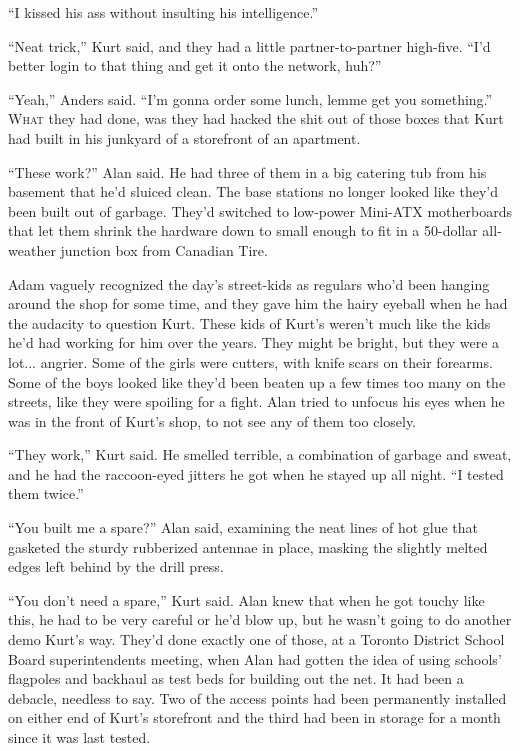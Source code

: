\documentclass{article}
\begin{document}
``I kissed his ass without insulting his intelligence.''

``Neat trick,'' Kurt said, and they had a little partner-to-partner
high-five.  ``I'd better login to that thing and get it onto the
network, huh?''

``Yeah,'' Anders said.  ``I'm gonna order some lunch, lemme get you
something.''
\\
\lettrine[lines=3, lhang=.5, nindent=0pt, findent=2pt]{W}{hat} they had done, was they had hacked the shit out of those boxes
that Kurt had built in his junkyard of a storefront of an apartment.

``These work?'' Alan said.  He had three of them in a big catering tub
from his basement that he'd sluiced clean.  The base stations no
longer looked like they'd been built out of garbage.  They'd switched
to low-power Mini-ATX motherboards that let them shrink the hardware
down to small enough to fit in a 50-dollar all-weather junction box
from Canadian Tire.

Adam vaguely recognized the day's street-kids as regulars who'd been
hanging around the shop for some time, and they gave him the hairy
eyeball when he had the audacity to question Kurt.  These kids of
Kurt's weren't much like the kids he'd had working for him over the
years.  They might be bright, but they were a lot...  angrier.  Some
of the girls were cutters, with knife scars on their forearms.  Some
of the boys looked like they'd been beaten up a few times too many on
the streets, like they were spoiling for a fight.  Alan tried to
unfocus his eyes when he was in the front of Kurt's shop, to not see
any of them too closely.

``They work,'' Kurt said.  He smelled terrible, a combination of
garbage and sweat, and he had the raccoon-eyed jitters he got when he
stayed up all night.  ``I tested them twice.''

``You built me a spare?'' Alan said, examining the neat lines of hot
glue that gasketed the sturdy rubberized antennae in place, masking
the slightly melted edges left behind by the drill press.

``You don't need a spare,'' Kurt said.  Alan knew that when he got
touchy like this, he had to be very careful or he'd blow up, but he
wasn't going to do another demo Kurt's way.  They'd done exactly one
of those, at a Toronto District School Board superintendents meeting,
when Alan had gotten the idea of using schools' flagpoles and backhaul
as test beds for building out the net.  It had been a debacle,
needless to say.  Two of the access points had been permanently
installed on either end of Kurt's storefront and the third had been in
storage for a month since it was last tested.
\end{document}
